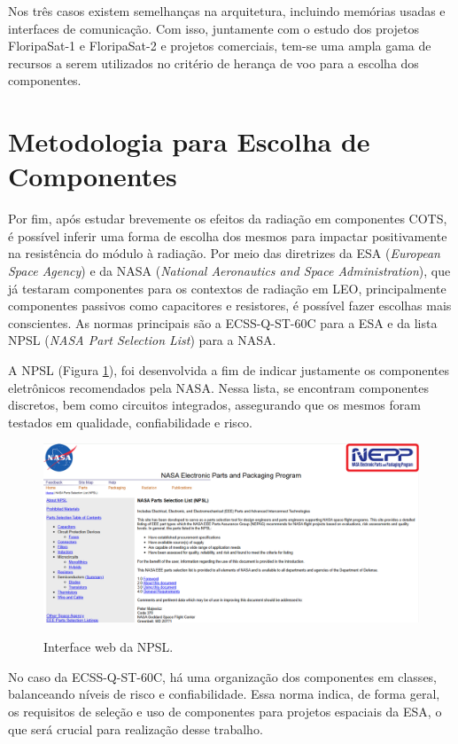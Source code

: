 Nos três casos existem semelhanças na arquitetura, incluindo memórias usadas e interfaces de comunicação. Com isso, juntamente com o estudo dos projetos FloripaSat-1 e FloripaSat-2 e projetos comerciais, tem-se uma ampla gama de recursos a serem utilizados no critério de herança de voo para a escolha dos componentes.

\section{Metodologia para Escolha de Componentes}

Por fim, após estudar brevemente os efeitos da radiação em componentes COTS, é possível inferir uma forma de escolha dos mesmos para impactar positivamente na resistência do módulo à radiação. Por meio das diretrizes da ESA (\textit{European Space Agency}) e da NASA (\textit{National Aeronautics and Space Administration}), que já testaram componentes para os contextos de radiação em LEO, principalmente componentes passivos como capacitores e resistores, é possível fazer escolhas mais conscientes. As normas principais são a ECSS-Q-ST-60C para a ESA e da lista NPSL (\textit{NASA Part Selection List}) para a NASA.

A NPSL (Figura \ref{fig:npsl}), foi desenvolvida a fim de indicar justamente os componentes eletrônicos recomendados pela NASA. Nessa lista, se encontram componentes discretos, bem como circuitos integrados, assegurando que os mesmos foram testados em qualidade, confiabilidade e risco. 

\begin{figure}[H]
    \centering
    \caption{Interface web da NPSL.}
    \includegraphics[width=\linewidth]{images/NPSL.png}
    \label{fig:npsl}
\end{figure}

No caso da ECSS-Q-ST-60C, há uma organização dos componentes em classes, balanceando níveis de risco e confiabilidade. Essa norma indica, de forma geral, os requisitos de seleção e uso de componentes para projetos espaciais da ESA, o que será crucial para realização desse trabalho.

